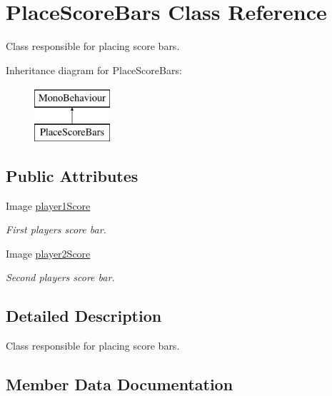 \hypertarget{class_place_score_bars}{}\section{Place\+Score\+Bars Class Reference}
\label{class_place_score_bars}


Class responsible for placing score bars.  


Inheritance diagram for Place\+Score\+Bars\+:\begin{figure}[H]
\begin{center}
\leavevmode
\includegraphics[height=2.000000cm]{class_place_score_bars}
\end{center}
\end{figure}
\subsection*{Public Attributes}
\begin{DoxyCompactItemize}
\item 
Image \mbox{\hyperlink{class_place_score_bars_acbdc64a22696d614a80fb2290e2e7be7}{player1\+Score}}
\begin{DoxyCompactList}\small\item\em First player\textquotesingle{}s score bar. \end{DoxyCompactList}\item 
Image \mbox{\hyperlink{class_place_score_bars_a53a2fc54c5de9160788eac17a2ff9e90}{player2\+Score}}
\begin{DoxyCompactList}\small\item\em Second player\textquotesingle{}s score bar. \end{DoxyCompactList}\end{DoxyCompactItemize}


\subsection{Detailed Description}
Class responsible for placing score bars. 



\subsection{Member Data Documentation}
\mbox{\label{class_place_score_bars_acbdc64a22696d614a80fb2290e2e7be7}} 
